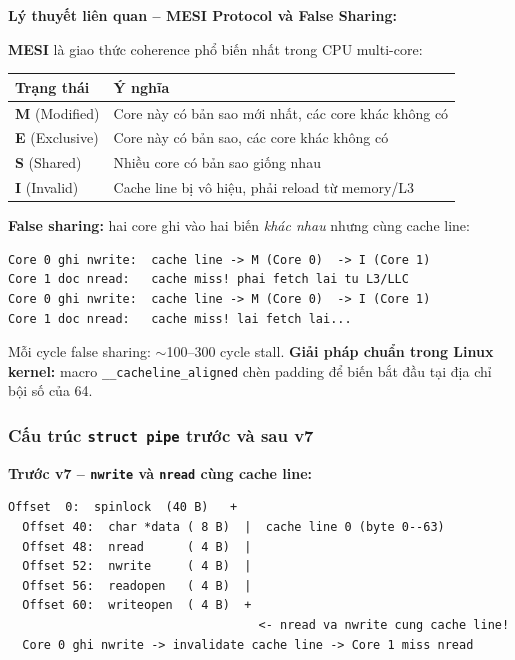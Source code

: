 \documentclass[11pt,a4paper]{article}
\begin{document}
\begin{callout}
\textbf{Lý thuyết liên quan -- MESI Protocol và False Sharing:}

\textbf{MESI} là giao thức coherence phổ biến nhất trong CPU multi-core:

\begin{center}
\begin{tabular}{ll}
\toprule
\textbf{Trạng thái} & \textbf{Ý nghĩa} \\
\midrule
\textbf{M} (Modified)  & Core này có bản sao mới nhất, các core khác không có \\
\textbf{E} (Exclusive) & Core này có bản sao, các core khác không có \\
\textbf{S} (Shared)    & Nhiều core có bản sao giống nhau \\
\textbf{I} (Invalid)   & Cache line bị vô hiệu, phải reload từ memory/L3 \\
\bottomrule
\end{tabular}
\end{center}

\textbf{False sharing:} hai core ghi vào hai biến \emph{khác nhau} nhưng cùng cache line:

\begin{lstlisting}[style=plain]
Core 0 ghi nwrite:  cache line -> M (Core 0)  -> I (Core 1)
Core 1 doc nread:   cache miss! phai fetch lai tu L3/LLC
Core 0 ghi nwrite:  cache line -> M (Core 0)  -> I (Core 1)
Core 1 doc nread:   cache miss! lai fetch lai...
\end{lstlisting}

Mỗi cycle false sharing: $\sim$100--300 cycle stall. \textbf{Giải pháp chuẩn trong Linux kernel:} macro \texttt{\_\_cacheline\_aligned} chèn padding để biến bắt đầu tại địa chỉ bội số của 64.
\end{callout}

\subsubsection{Cấu trúc \texttt{struct pipe} trước và sau v7}

\textbf{Trước v7 -- \texttt{nwrite} và \texttt{nread} cùng cache line:}

\begin{lstlisting}[style=plain]
  Offset  0:  spinlock  (40 B)   +
  Offset 40:  char *data ( 8 B)  |  cache line 0 (byte 0--63)
  Offset 48:  nread      ( 4 B)  |
  Offset 52:  nwrite     ( 4 B)  |
  Offset 56:  readopen   ( 4 B)  |
  Offset 60:  writeopen  ( 4 B)  +
                                   <- nread va nwrite cung cache line!
  Core 0 ghi nwrite -> invalidate cache line -> Core 1 miss nread
\end{lstlisting}
\end{document}
